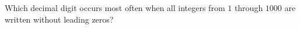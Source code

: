 Which decimal digit occurs most often when all integers from $1$ through $1000$ are written without leading zeros?
